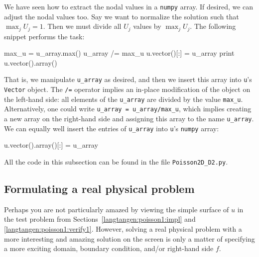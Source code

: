 We have seen how to extract the nodal values in a {\fontsize{10pt}{10pt}\texttt{numpy}} array.
If desired, we can adjust the nodal values too. Say we want to
normalize the solution such that $\max_j U_j = 1$. Then we
must divide all $U_j$ values
by $\max_j U_j$. The following snippet performs the task:
\begin{python}
max_u = u_array.max()
u_array /= max_u
u.vector()[:] = u_array
print u.vector().array()
\end{python}
That is, we manipulate {\fontsize{10pt}{10pt}\verb!u_array!} as desired, and then
we insert this array into {\fontsize{10pt}{10pt}\texttt{u}}'s {\fontsize{10pt}{10pt}\texttt{Vector}} object.
The {\fontsize{10pt}{10pt}\verb!/=!} operator implies an
in-place modification of the object on the left-hand side: all
elements of the {\fontsize{10pt}{10pt}\verb!u_array!} are divided by the value {\fontsize{10pt}{10pt}\verb!max_u!}.
Alternatively, one could write
{\fontsize{10pt}{10pt}\verb!u_array = u_array/max_u!}, which implies creating a new
array on the right-hand side and assigning this array to the
name {\fontsize{10pt}{10pt}\verb!u_array!}.
We can equally well insert the entries of {\fontsize{10pt}{10pt}\verb!u_array!} into
{\fontsize{10pt}{10pt}\texttt{u}}'s {\fontsize{10pt}{10pt}\texttt{numpy}} array:
\begin{python}
u.vector().array()[:] = u_array
\end{python}
All the code in this subsection can be found in the file {\fontsize{10pt}{10pt}\verb!Poisson2D_D2.py!}.


\subsection{Formulating a real physical problem}
\label{langtangen:poisson:membrane}

Perhaps you are not particularly 
amazed by viewing the simple surface of $u$ in the 
test problem from Sections~\ref{langtangen:poisson1:impl}
and \ref{langtangen:poisson1:verify1}.
However, solving a real physical problem with a more interesting and amazing 
solution on the screen
is only a matter
of specifying a more exciting domain, boundary condition, and/or
right-hand side $f$.

